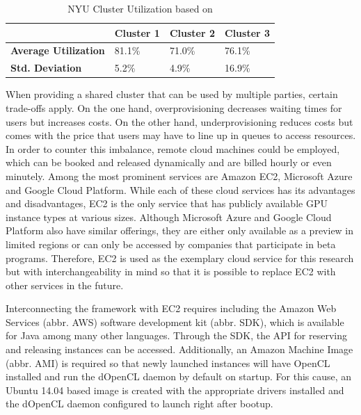 \begin{table}[!htb]
	\centering
	\begin{adjustbox}{width=0.5\textwidth}
		\small
		\begin{tabular}{l | l | l | l}
			~						& \textbf{Cluster 1}	& \textbf{Cluster 2}	& \textbf{Cluster 3}                 \\
			\hline
			\textbf{Average Utilization} 	& 81.1\%  	& 71.0\% 	& 76.1\% \\
			\textbf{Std. Deviation}          & 5.2\%  	& 4.9\%		& 16.9\% \\
		\end{tabular}
	\end{adjustbox}

	\caption{NYU Cluster Utilization based on \cite{nyu}}
	\label{table:cluster_utilization}
\end{table}

When providing a shared cluster that can be used by multiple parties, certain trade-offs apply. On the one hand, overprovisioning decreases waiting times for users but increases costs. On the other hand, underprovisioning reduces costs but comes with the price that users may have to line up in queues to access resources. In order to counter this imbalance, remote cloud machines could be employed, which can be booked and released dynamically and are billed hourly or even minutely. Among the most prominent services are Amazon EC2, Microsoft Azure and Google Cloud Platform. While each of these cloud services has its advantages and disadvantages, EC2 is the only service that has publicly available GPU instance types at various sizes. Although Microsoft Azure and Google Cloud Platform also have similar offerings, they are either only available as a preview in limited regions or can only be accessed by companies that participate in beta programs. Therefore, EC2 is used as the exemplary cloud service for this research but with interchangeability in mind so that it is possible to replace EC2 with other services in the future.

Interconnecting the framework with EC2 requires including the Amazon Web Services (abbr. AWS) software development kit (abbr. SDK), which is available for Java among many other languages. Through the SDK, the API for reserving and releasing instances can be accessed. Additionally, an Amazon Machine Image (abbr. AMI) is required so that newly launched instances will have OpenCL installed and run the dOpenCL daemon by default on startup. For this cause, an Ubuntu 14.04 based image is created with the appropriate drivers installed and the dOpenCL daemon configured to launch right after bootup.

